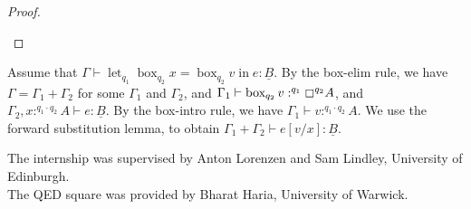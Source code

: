 \documentclass[acmsmall,screen,nonacm]{acmart}
\DeclareMathOperator{\llet}{\text{let}}
\DeclareMathOperator{\lin}{\text{in}}
\DeclareMathOperator{\bbox}{\text{box}}
\DeclareMathOperator{\while}{\text{while}}
\newcommand{\tee}{\vdash}
\begin{document}
\begin{proof}
\begin{description}






    
  \end{description}
\end{proof}

Assume that $\Gamma \tee \llet_{q_1} \bbox_{q_2} x = \bbox_{q_2} v \lin e : \underline{B}$.
By the box-elim rule, we have $\Gamma = \Gamma_1 + \Gamma_2$ for some $\Gamma_1$ and $\Gamma_2$,
and $\Gamma_1 \tee \bbox_{q_2} v :^{q_1} \boxempty^{q_2} A$,
and $\Gamma_2, x :^{q_1 \cdot q_2} A \tee e : \underline{B}$.
By the box-intro rule, we have $\Gamma_1 \tee v :^{q_1 \cdot q_2} A$.
We use the forward substitution lemma, to obtain $\Gamma_1 + \Gamma_2 \tee e[v/x] : \underline{B}$.

\begin{acks}

The internship was supervised by Anton Lorenzen and Sam Lindley, University of Edinburgh. \\
The QED square was provided by Bharat Haria, University of Warwick.

\end{acks}



\end{document}
